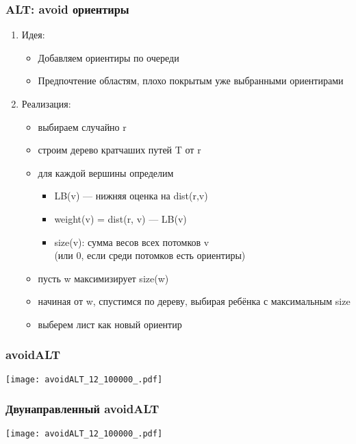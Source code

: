 \documentclass{beamer}
\begin{document}
\begin{frame}
\frametitle{ALT: avoid ориентиры}
\begin{enumerate}	
\item Идея:

	\begin{itemize}
    \item Добавляем ориентиры по очереди
    \item Предпочтение областям, плохо покрытым уже выбранными ориентирами
    \end{itemize}
    
\item Реализация:

	\begin{itemize}
    \item выбираем случайно r
    \item строим дерево кратчаших путей T от r
    \item для каждой вершины определим
      \begin{itemize}
      \item LB(v) --- нижняя оценка на dist(r,v)
      \item weight(v) = dist(r, v) --- LB(v)
      \item size(v): сумма весов всех потомков v\\ (или 0, если среди потомков есть ориентиры)
      \end{itemize}
    \item пусть w максимизирует size(w)
    \item начиная от w, спустимся по дереву, выбирая ребёнка с максимальным size
    \item выберем лист как новый ориентир
    \end{itemize}
    
\end{enumerate}

\end{frame}



\begin{frame}
\frametitle{avoidALT}
\texttt{[image: avoidALT\_12\_100000\_.pdf]}
\end{frame}


\begin{frame}
\frametitle{Двунаправленный avoidALT}
\texttt{[image: avoidALT\_12\_100000\_.pdf]}
\end{frame}
\end{document}
